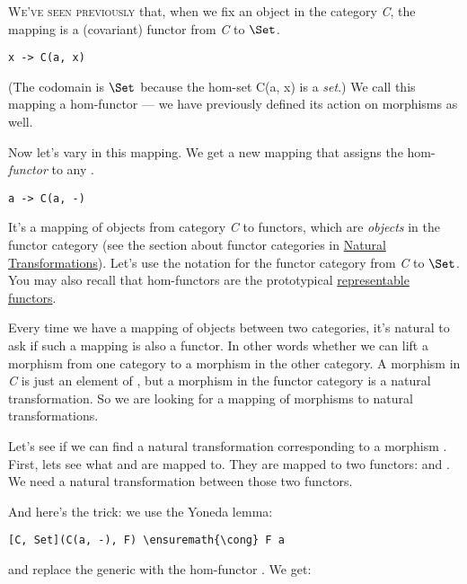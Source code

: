 \lettrine[lhang=0.17]{W}{e've seen previously} that, when we fix an object  in the
category \emph{C}, the mapping  is a (covariant)
functor from \emph{C} to $\Set$.

\begin{Verbatim}[commandchars=\\\{\}]
x -> C(a, x)
\end{Verbatim}
(The codomain is $\Set$ because the hom-set C(a, x) is a
\emph{set}.) We call this mapping a hom-functor --- we have previously
defined its action on morphisms as well.

Now let's vary  in this mapping. We get a new mapping that
assigns the hom-\emph{functor}  to any .

\begin{Verbatim}[commandchars=\\\{\}]
a -> C(a, -)
\end{Verbatim}
It's a mapping of objects from category \emph{C} to functors, which are
\emph{objects} in the functor category (see the section about functor
categories in
\hyperref[natural-transformations]{Natural
Transformations}). Let's use the notation \code{{[}C, Set{]}} for the
functor category from \emph{C} to $\Set$. You may also recall that
hom-functors are the prototypical
\hyperref[chap-representable-functors]{representable
functors}.

Every time we have a mapping of objects between two categories, it's
natural to ask if such a mapping is also a functor. In other words
whether we can lift a morphism from one category to a morphism in the
other category. A morphism in \emph{C} is just an element of
, but a morphism in the functor category
\code{{[}C, Set{]}} is a natural transformation. So we are looking
for a mapping of morphisms to natural transformations.

Let's see if we can find a natural transformation corresponding to a
morphism . First, lets see what
 and  are mapped to. They are mapped to two
functors:  and . We need a natural
transformation between those two functors.

And here's the trick: we use the Yoneda lemma:

\begin{Verbatim}[commandchars=\\\{\}]
[C, Set](C(a, -), F) \ensuremath{\cong} F a
\end{Verbatim}
and replace the generic  with the hom-functor
. We get:

